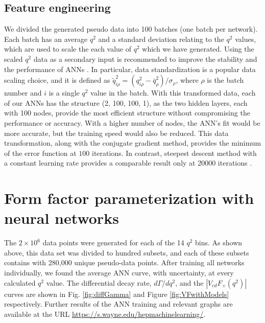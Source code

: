 \subsection{Feature engineering}\label{sec:feature_eng}

We divided the generated pseudo data into 100 batches (one batch per network). Each batch has an average $q^2$ and a standard deviation relating to the $q^2$ values, which are used to scale the each value of $q^2$ which we have generated. Using the scaled $q^2$ data as a secondary input is recommended to improve the stability and the 
performance of ANNs \cite{patro2015normalization}. In particular, data standardization is a popular data scaling choice, and it is defined as 
$\tilde{q}^2_{ i\rho} = \left(q^2_{i\rho} - \bar{q}^2_{\rho}\right)/\sigma_\rho$, where $\rho$ is the batch number and $i$ is a single $q^2$ value in the batch. With this transformed data, 
each of our ANNs has the structure (2, 100, 100, 1), as the two hidden layers, each with 100 nodes, provide the most efficient structure without compromising the performance or accuracy. 
With a higher number of nodes, the ANN's fit would be more accurate, but the training speed would also be reduced. This data transformation, along with the conjugate gradient method, 
provides the minimum of the error function at $100$ iterations. In contrast, steepest descent method with a constant learning rate provides a comparable result only at 20000 iterations \cite{Grant:2019yar}. 

\section{Form factor parameterization with neural networks}

The $2\times10^{6}$ data points were generated for each of the 14 $q^2$ bins. As shown above, this data set was divided to hundred subsets, and each of these subsets contains with 280,000 unique pseudo-data points. After training all networks individually, we found the average ANN curve, with uncertainty, at every calculated $q^2$ value. The differential decay rate, $d\Gamma/dq^2$, and the $\left|V_{cd} F_{+}(q^2)\right|$ curves are shown in Fig. \ref{fig:diffGamma} and Figure \ref{fig:VFwithModels} respectively.
Further results of the ANN training and relevant graphs are available at the URL \url{https://s.wayne.edu/hepmachinelearning/}.

%


